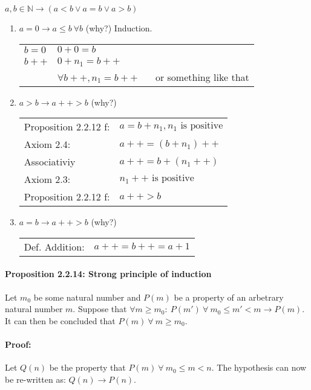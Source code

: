 \documentclass[letterpaper]{article}
\begin{document}
$a,b \in \mathbb{N} \to (a < b \lor a = b \lor a > b)$
\begin{enumerate}
	\item $a = 0 \to a \leq b~ \forall b$ (why?) Induction.
			\begin{center}
				\begin{tabular}{l l}
					$b = 0$ & $0 + 0 = b$ \\
					$b ++ $ & $0 + n_1 = b++$ \\
									& $\forall b++, n_1 = b++$~~~  or something like that
				\end{tabular}
			\end{center}

	\item $a > b \to a++ > b$ (why?)
			\begin{center}
				\begin{tabular}{l l}
					Proposition 2.2.12 f: & $a = b + n_1, n_1 \text{ is positive}$ \\
					Axiom 2.4:            & $a++ = (b + n_1)++$ \\
					Associativiy          & $a++ = b + (n_1++)$ \\
					Axiom 2.3:            & $n_1++ \text{ is positive}$ \\
					Proposition 2.2.12 f: & $a++ > b$
				\end{tabular}
			\end{center}

	\item $a = b \to a++ > b$ (why?)
			\begin{center}
				\begin{tabular}{l l}
					Def. Addition: & $a++ = b++ = a + 1$
				\end{tabular}
			\end{center}
\end{enumerate}

\paragraph{Proposition 2.2.14: Strong principle of induction}

Let $m_0$ be some natural number and $P(m)$ be a property of an arbetrary natural number $m$. Suppose that $\forall m \geq m_0:~ P(m')~ \forall~ m_0 \leq m' < m \to P(m)$. It can then be concluded that $P(m)~ \forall~ m \geq m_0$.

\paragraph{Proof:}
Let $Q(n)$ be the property that $P(m)~ \forall~ m_0 \leq m < n$. The hypothesis can now be re-written as: $Q(n) \to P(n)$.
\end{document}
